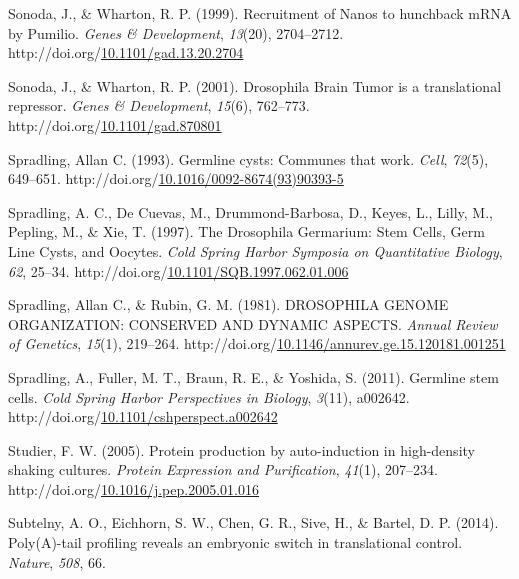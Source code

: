 \documentclass[12pt,oneside]{reedthesis}
\newlength{\cslhangindent}
\newenvironment{CSLReferences}[2] %
 {%
  \setlength{\parindent}{0pt}
  \ifodd #1 \everypar{\setlength{\hangindent}{\cslhangindent}}\ignorespaces\fi
  \ifnum #2 > 0
  \setlength{\parskip}{#2\baselineskip}
  \fi
 }%
 {}
\begin{document}
\begin{CSLReferences}{1}{0}
\leavevmode{}%
Sonoda, J., \& Wharton, R. P. (1999). Recruitment of {Nanos} to hunchback {mRNA} by {Pumilio}. \emph{Genes \& Development}, \emph{13}(20), 2704--2712. http://doi.org/\href{https://doi.org/10.1101/gad.13.20.2704}{10.1101/gad.13.20.2704}

\leavevmode{}%
Sonoda, J., \& Wharton, R. P. (2001). Drosophila {Brain Tumor} is a translational repressor. \emph{Genes \& Development}, \emph{15}(6), 762--773. http://doi.org/\href{https://doi.org/10.1101/gad.870801}{10.1101/gad.870801}

\leavevmode{}%
Spradling, Allan C. (1993). Germline cysts: {Communes} that work. \emph{Cell}, \emph{72}(5), 649--651. http://doi.org/\href{https://doi.org/10.1016/0092-8674(93)90393-5}{10.1016/0092-8674(93)90393-5}

\leavevmode{}%
Spradling, A. C., De Cuevas, M., Drummond-Barbosa, D., Keyes, L., Lilly, M., Pepling, M., \& Xie, T. (1997). The {Drosophila Germarium}: {Stem Cells}, {Germ Line Cysts}, and {Oocytes}. \emph{Cold Spring Harbor Symposia on Quantitative Biology}, \emph{62}, 25--34. http://doi.org/\href{https://doi.org/10.1101/SQB.1997.062.01.006}{10.1101/SQB.1997.062.01.006}

\leavevmode{}%
Spradling, Allan C., \& Rubin, G. M. (1981). {DROSOPHILA GENOME ORGANIZATION}: {CONSERVED AND DYNAMIC ASPECTS}. \emph{Annual Review of Genetics}, \emph{15}(1), 219--264. http://doi.org/\href{https://doi.org/10.1146/annurev.ge.15.120181.001251}{10.1146/annurev.ge.15.120181.001251}

\leavevmode{}%
Spradling, A., Fuller, M. T., Braun, R. E., \& Yoshida, S. (2011). Germline stem cells. \emph{Cold Spring Harbor Perspectives in Biology}, \emph{3}(11), a002642. http://doi.org/\href{https://doi.org/10.1101/cshperspect.a002642}{10.1101/cshperspect.a002642}

\leavevmode{}%
Studier, F. W. (2005). Protein production by auto-induction in high-density shaking cultures. \emph{Protein Expression and Purification}, \emph{41}(1), 207--234. http://doi.org/\href{https://doi.org/10.1016/j.pep.2005.01.016}{10.1016/j.pep.2005.01.016}

\leavevmode{}%
Subtelny, A. O., Eichhorn, S. W., Chen, G. R., Sive, H., \& Bartel, D. P. (2014). Poly({A})-tail profiling reveals an embryonic switch in translational control. \emph{Nature}, \emph{508}, 66.


\end{CSLReferences}
\end{document}
